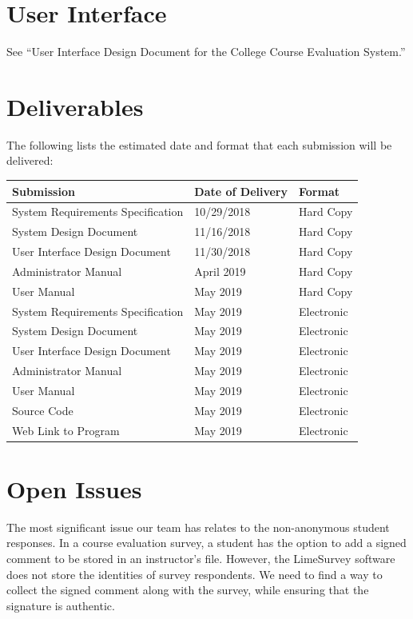 \documentclass{article}
\begin{document}
\newpage
\section{User Interface}

See ``User Interface Design Document for the College Course Evaluation System.''

\section{Deliverables}

The following lists the estimated date and format that each submission will be delivered:

\begin{center}
\begin{tabular}{|p{6cm}|p{3cm}|p{3cm}|} 
\hline
\textbf{Submission} & \textbf{Date of Delivery} & \textbf{Format} \\
\hline
System Requirements Specification & 10/29/2018 & Hard Copy\\ 
\hline
System Design Document & 11/16/2018 & Hard Copy\\ 
\hline
User Interface Design Document & 11/30/2018 & Hard Copy\\ 
\hline
Administrator Manual & April 2019 & Hard Copy\\ 
\hline
User Manual & May 2019 & Hard Copy\\ 
\hline
System Requirements Specification & May 2019 & Electronic\\ 
\hline
System Design Document & May 2019 & Electronic\\ 
\hline
User Interface Design Document & May 2019 & Electronic\\ 
\hline
Administrator Manual & May 2019 & Electronic\\ 
\hline
User Manual & May 2019 & Electronic\\ 
\hline
Source Code & May 2019 & Electronic\\ 
\hline
Web Link to Program & May 2019 & Electronic\\ 
\hline
\end{tabular}
\end{center}

\section{Open Issues}

The most significant issue our team has relates to the non-anonymous student responses. In a course evaluation survey, a student has the option to add a signed comment to be stored in an instructor's file. However, the LimeSurvey software does not store the identities of survey respondents. We need to find a way to collect the signed comment along with the survey, while ensuring that the signature is authentic.
\end{document}
